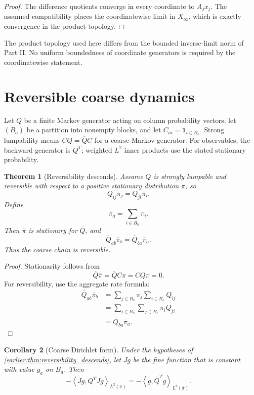 \documentclass[11pt,a4paper]{article}
\newtheorem{theorem}{Theorem}[section]
\newtheorem{corollary}[theorem]{Corollary}
\theoremstyle{definition}
\theoremstyle{remark}
\newcommand{\one}{\bm 1}
\newcommand{\ip}[2]{\left\langle#1,#2\right\rangle}
\begin{document}
\begin{proof}
The difference quotients converge in every coordinate to \(A_jx_j\). The assumed compatibility places the coordinatewise limit in \(X_\infty\), which is exactly convergence in the product topology.
\end{proof}


The product topology used here differs from the bounded inverse-limit norm of Part II. No uniform boundedness of coordinate generators is required by the coordinatewise statement.
\section{Reversible coarse dynamics}\label{earlier:section:02}
Let $Q$ be a finite Markov generator acting on column probability vectors, let $(B_a)$ be a partition into nonempty blocks, and let $C_{ai}=\one_{i\in B_a}$. Strong lumpability means $CQ=\overline Q C$ for a coarse Markov generator. For observables, the backward generator is $Q^T$; weighted $L^2$ inner products use the stated stationary probability.
\begin{theorem}[Reversibility descends]\label{earlier:record:009}\label{earlier:thm:reversibility_descends}
Assume \(Q\) is strongly lumpable and reversible with respect to a positive stationary distribution \(\pi\), so
\[
Q_{ij}\pi_j=Q_{ji}\pi_i.
\]
Define
\[
\overline\pi_a=\sum_{i\in B_a}\pi_i.
\]
Then \(\overline\pi\) is stationary for \(\overline Q\), and
\[
\overline Q_{ab}\overline\pi_b
=
\overline Q_{ba}\overline\pi_a.
\]
Thus the coarse chain is reversible.
\end{theorem}

\begin{proof}
Stationarity follows from
\[
\overline Q\overline\pi
=\overline QC\pi
=CQ\pi=0.
\]
For reversibility, use the aggregate rate formula:
\[
\begin{aligned}
\overline Q_{ab}\overline\pi_b
&=\sum_{j\in B_b}\pi_j\sum_{i\in B_a}Q_{ij}\\
&=\sum_{i\in B_a}\sum_{j\in B_b}\pi_iQ_{ji}\\
&=\overline Q_{ba}\overline\pi_a.
\end{aligned}
\]
\end{proof}

\begin{corollary}[Coarse Dirichlet form]\label{earlier:record:010}\label{earlier:cor:coarse_dirichlet_form}
Under the hypotheses of \cref{earlier:thm:reversibility_descends}, let \(Jg\) be the fine function that is constant with value \(g_a\) on \(B_a\). Then
\[
-\ip{Jg}{Q^TJg}_{L^2(\pi)}
=
-\ip{g}{\overline Q^Tg}_{L^2(\overline\pi)}.
\]
\end{corollary}
\end{document}
